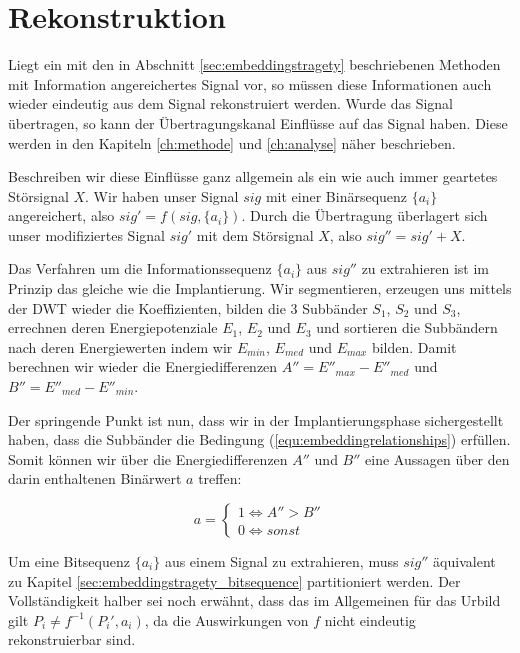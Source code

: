 \section{Rekonstruktion}
\label{sec:reconstruction}

Liegt ein mit den in Abschnitt \ref{sec:embeddingstragety} beschriebenen Methoden mit Information angereichertes Signal vor, so müssen diese Informationen auch wieder eindeutig aus dem Signal rekonstruiert werden. Wurde das Signal übertragen, so kann der Übertragungskanal Einflüsse auf das Signal haben. Diese werden in den Kapiteln \ref{ch:methode} und \ref{ch:analyse} näher beschrieben. 

Beschreiben wir diese Einflüsse ganz allgemein als ein wie auch immer geartetes Störsignal $X$. Wir haben unser Signal $sig$ mit einer Binärsequenz $\{{a}_{i}\}$ angereichert, also $sig' = f( sig, \{{a}_{i}\})$. Durch die Übertragung überlagert sich unser modifiziertes Signal $sig'$ mit dem Störsignal $X$, also $sig'' = sig' + X$.

Das Verfahren um die Informationssequenz $\{{a}_{i}\}$ aus $sig''$ zu extrahieren ist im Prinzip das gleiche wie die Implantierung. Wir segmentieren, erzeugen uns mittels der DWT wieder die Koeffizienten, bilden die 3 Subbänder ${S}_{1}$, ${S}_{2}$ und ${S}_{3}$, errechnen deren Energiepotenziale ${E}_{1}$, ${E}_{2}$ und ${E}_{3}$ und sortieren die Subbändern nach deren Energiewerten indem wir ${E}_{min}$, ${E}_{med}$ und ${E}_{max}$ bilden. Damit berechnen wir wieder die Energiedifferenzen $A'' = {E''}_{max} - {E''}_{med}$ und $B'' = {E''}_{med} - {E''}_{min}$.

Der springende Punkt ist nun, dass wir in der Implantierungsphase sichergestellt haben, dass die Subbänder die Bedingung (\ref{equ:embeddingrelationships}) erfüllen. Somit können wir über die Energiedifferenzen $A''$ und $B''$ eine Aussagen über den darin enthaltenen Binärwert $a$ treffen:

	 \begin{equation}
		 a = \begin{cases}
    	 	1 \iff A'' > B''	 
			\\
    		0 \iff sonst
  		 \end{cases}
	 	\label{equ:extraction_bedingungen}
	 \end{equation}
	 
Um eine Bitsequenz $\{{a}_{i}\}$ aus einem Signal zu extrahieren, muss $sig''$ äquivalent zu Kapitel \ref{sec:embeddingstragety_bitsequence} partitioniert werden. Der Vollständigkeit halber sei noch erwähnt, dass das im Allgemeinen für das Urbild gilt ${P}_{i} \neq f^{-1}({P}_{i}', {a}_{i})$, da die Auswirkungen von $f$ nicht eindeutig rekonstruierbar sind. 

